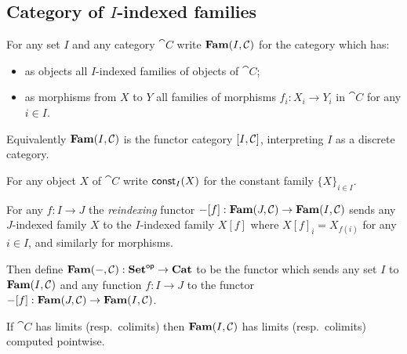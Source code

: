 \subsection{Category of $I$-indexed families}
\label{sec:fam}

\begin{definition}
For any set $I$ and any category $\cat{C}$ write $\mathbf{Fam}(I,\mathcal{C})$ for the category which has:
\begin{itemize}
\item as objects all $I$-indexed families of objects of $\cat{C}$;
\item as morphisms from $X$ to $Y$ all families of morphisms $f_i: X_i \to Y_i$ in $\cat{C}$ for any $i \in
I$.
\end{itemize}
\end{definition}

\noindent Equivalently $\mathbf{Fam}(I,\mathcal{C})$ is the functor category $[I,\mathcal{C}]$, interpreting $I$ as a
discrete category.

\begin{definition}
For any object $X$ of $\cat{C}$ write $\mathsf{const}_I(X)$ for the constant family $\{X\}_{i \in I}$.
\end{definition}

\begin{definition}[Reindexing]
For any $f: I \to J$ the \emph{reindexing} functor $-[f]: \mathbf{Fam}(J,\mathcal{C}) \to \mathbf{Fam}(I,\mathcal{C})$ sends
any $J$-indexed family $X$ to the $I$-indexed family $X[f]$ where $X[f]_i = X_{f(i)}$ for any $i \in I$, and
similarly for morphisms.
\end{definition}

\begin{definition}
Then define $\mathbf{Fam}(-,\mathcal{C}): \mathbf{Set}^{\mathsf{op}} \to \mathbf{Cat}$ to be the functor which sends any set $I$ to
$\mathbf{Fam}(I,\mathcal{C})$ and any function $f: I \to J$ to the functor $-[f]: \mathbf{Fam}(J,\mathcal{C}) \to
\mathbf{Fam}(I,\mathcal{C})$.
\end{definition}

\begin{proposition}
If $\cat{C}$ has limits (resp.~colimits) then $\mathbf{Fam}(I,\mathcal{C})$ has limits (resp.~colimits) computed
pointwise.
\end{proposition}
